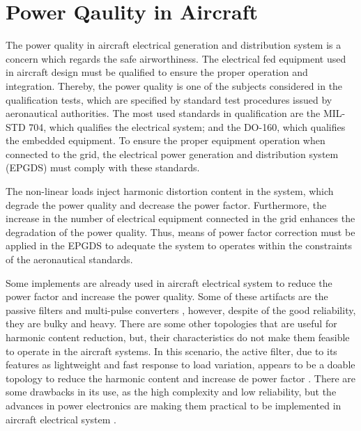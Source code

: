 \section{Power Qaulity in Aircraft}

The power quality in aircraft electrical generation and distribution system is a concern which regards the safe airworthiness. The electrical fed equipment used in aircraft design must be qualified to ensure the proper operation and integration. Thereby, the power quality is one of the subjects considered in the qualification tests, which are specified by standard test procedures issued by aeronautical authorities. The most used standards in qualification are the MIL-STD 704, which qualifies the electrical system; and the DO-160, which qualifies the embedded equipment. To ensure the proper equipment operation when connected to the grid, the electrical power generation and distribution system (EPGDS) must comply with these standards.

The non-linear loads inject harmonic distortion content in the system, which degrade the power quality and decrease the power factor. Furthermore, the increase in the number of electrical equipment connected in the grid enhances the degradation of the power quality. Thus, means of power factor correction must be applied in the EPGDS to adequate the system to operates within the constraints of the aeronautical standards.

Some implements are already used in aircraft electrical system to reduce the power factor and increase the power quality. Some of these artifacts are the passive filters and multi-pulse converters \cite{Zhu2014,Gong2003,Lobo2005}, however, despite of the good reliability, they are bulky and heavy. There are some other topologies that are useful for harmonic content reduction, but, their characteristics do not make them feasible to operate in the aircraft systems. In this scenario, the active filter, due to its features as lightweight and fast response to load variation, appears to be a doable topology to reduce the harmonic content and increase de power factor \cite{Zhu2014,Chen2012control,Karatzaferis2013}. There are some drawbacks in its use, as the high complexity and low reliability, but the advances in power electronics are making them practical to be implemented in aircraft electrical system \cite{Abdelhafez2009}.



